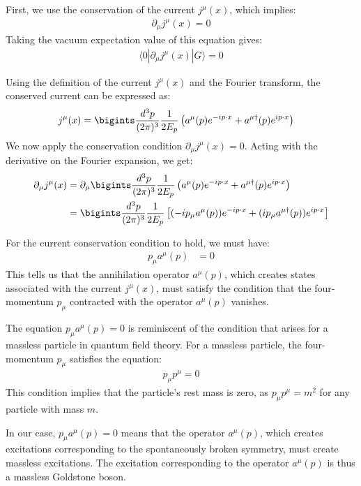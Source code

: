 \begin{itemize}
First, we use the conservation of the current $j^\mu(x)$, which implies:
\begin{align}
    \partial_\mu j^\mu(x) = 0
\end{align}
Taking the vacuum expectation value of this equation gives:
\begin{align}
    \langle 0 | \partial_\mu j^\mu(x) | G \rangle = 0
\end{align}

Using the definition of the current $j^\mu(x)$ and the Fourier transform, the conserved current can be expressed as:
\begin{align}
    j^\mu(x) &= \bigints\frac{d^3 p}{(2\pi)^3} \frac{1}{2E_p} \left( a^\mu(p) e^{-ip \cdot x} + a^{\mu \dagger}(p) e^{ip \cdot x} \right)
\end{align}
We now apply the conservation condition $\partial_\mu j^\mu(x) = 0$. Acting with the derivative on the Fourier expansion, we get:
\begin{align}
    \partial_\mu j^\mu(x) &= \partial_\mu \bigints\frac{d^3 p}{(2\pi)^3} \frac{1}{2E_p} \left( a^\mu(p) e^{-ip \cdot x} + a^{\mu \dagger}(p) e^{ip \cdot x} \right)\notag\\
    &= \bigints\frac{d^3 p}{(2\pi)^3} \frac{1}{2E_p} \left[ (-ip_\mu a^\mu(p)) e^{-ip \cdot x} + (ip_\mu a^{\mu \dagger}(p)) e^{ip \cdot x} \right]
\end{align}

For the current conservation condition to hold, we must have:
\begin{align}
    p_\mu a^\mu(p) &= 0
\end{align}
This tells us that the annihilation operator $a^\mu(p)$, which creates states associated with the current $j^\mu(x)$, must satisfy the condition that the four-momentum $p_\mu$ contracted with the operator $a^\mu(p)$ vanishes.

The equation $p_\mu a^\mu(p) = 0$ is reminiscent of the condition that arises for a massless particle in quantum field theory. For a massless particle, the four-momentum $p_\mu$ satisfies the equation:
\begin{align}
    p_\mu p^\mu = 0
\end{align}
This condition implies that the particle's rest mass is zero, as $p_\mu p^\mu = m^2$ for any particle with mass $m$.

In our case, $p_\mu a^\mu(p) = 0$ means that the operator $a^\mu(p)$, which creates excitations corresponding to the spontaneously broken symmetry, must create massless excitations. The excitation corresponding to the operator $a^\mu(p)$ is thus a massless Goldstone boson.
\end{itemize}
\bigskip\bigskip\hline\hline\bigskip
